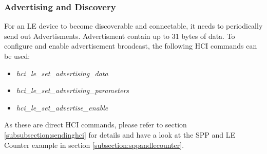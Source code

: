 
\subsubsection{Advertising and Discovery}

For an LE device to become discoverable and connectable, it needs to periodically send out Advertisments. Advertisment contain up to 31 bytes of data. To configure and enable advertisement broadcast, the following HCI commands can be used:
\begin{itemize}
\item \emph{hci\_le\_set\_advertising\_data}
\item \emph{hci\_le\_set\_advertising\_parameters}
\item \emph{hci\_le\_set\_advertise\_enable}
\end{itemize}
As these are direct HCI commands, please refer to section \ref{subsubsection:sendinghci} for details and have a look at the SPP and LE Counter example in section \ref{subsection:sppandlecounter}.

